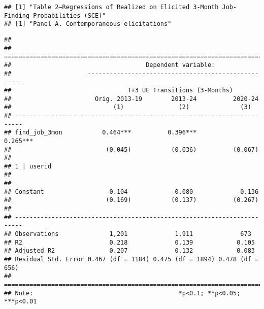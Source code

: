 
\begin{verbatim}
## [1] "Table 2—Regressions of Realized on Elicited 3-Month Job-Finding Probabilities (SCE)"
## [1] "Panel A. Contemporaneous elicitations"
\end{verbatim}

\begin{verbatim}
## 
## ========================================================================
##                                     Dependent variable:                 
##                     ----------------------------------------------------
##                                T+3 UE Transitions (3-Months)            
##                       Orig. 2013-19        2013-24          2020-24     
##                            (1)               (2)              (3)       
## ------------------------------------------------------------------------
## find_job_3mon           0.464***          0.396***          0.265***    
##                          (0.045)           (0.036)          (0.067)     
##                                                                         
## 1 | userid                                                              
##                                                                         
##                                                                         
## Constant                 -0.104            -0.080            -0.136     
##                          (0.169)           (0.137)          (0.267)     
##                                                                         
## ------------------------------------------------------------------------
## Observations              1,201             1,911             673       
## R2                        0.218             0.139            0.105      
## Adjusted R2               0.207             0.132            0.083      
## Residual Std. Error 0.467 (df = 1184) 0.475 (df = 1894) 0.478 (df = 656)
## ========================================================================
## Note:                                        *p<0.1; **p<0.05; ***p<0.01
\end{verbatim}

